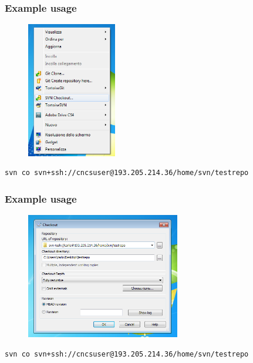 \documentclass[10pt]{beamer}
\begin{document}
\begin{frame}[fragile]
\frametitle{Example usage}
\begin{figure}[h]
 \centering
 \includegraphics[width=0.35\textwidth]{images/image1.png}
\end{figure}
\begin{verbatim}
svn co svn+ssh://cncsuser@193.205.214.36/home/svn/testrepo 
\end{verbatim}
\end{frame}

\begin{frame}[fragile]
\frametitle{Example usage}
\begin{figure}[h]
 \centering
 \includegraphics[width=0.6\textwidth]{images/image2.png}
\end{figure}
\begin{verbatim}
svn co svn+ssh://cncsuser@193.205.214.36/home/svn/testrepo 
\end{verbatim}
\end{frame}
\end{document}
